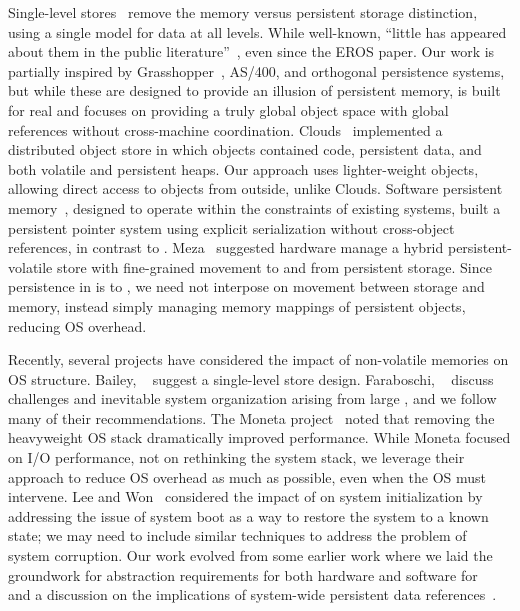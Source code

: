 {    Single-level stores~\cite{shapiro:usenix02,shekita:uwtr956,dearle:cs94} remove the
    memory versus persistent storage distinction, using a single model for data
    at all levels. While well-known,
    ``little has appeared about them in the public
    literature''~\cite{shapiro:usenix02}, even since the EROS paper.
    Our work is partially inspired by Grasshopper~\cite{dearle:cs94}, AS/400, and orthogonal persistence systems,
    but while these are designed to provide an illusion of persistent
    memory, \Twizzler is built for real \NVM and focuses on providing a truly global object space with
    global references without cross-machine coordination.
    Clouds~\cite{dasgupta:computer91} implemented a distributed object store in
    which objects contained code, persistent data, and both volatile and
    persistent heaps. Our approach uses lighter-weight objects, allowing direct
    access to objects from outside, unlike Clouds. Software persistent
    memory~\cite{guerra:atc12}, designed to operate within the constraints
    of existing systems, built a persistent pointer system using explicit
    serialization without cross-object references, in contrast to \Twizzler.
    Meza~\cite{meza:weed13}
    suggested hardware manage a hybrid persistent-volatile store with
    fine-grained movement to and from persistent storage. Since
    persistence in \Twizzler is to \NVM, we need not interpose on
    movement between storage and memory,
    instead simply managing memory mappings of persistent objects,
    reducing OS overhead.

    Recently, several projects have considered the impact of non-volatile
    memories on OS structure. Bailey,
    \etal~\cite{bailey:hotos11} suggest a single-level store design.
    Faraboschi, \etal~\cite{faraboschi:hotos15} discuss challenges and inevitable system organization
    arising from large \NVM, and we follow many of their recommendations.
    The Moneta
    project~\cite{caulfield:micro10} noted that removing the
    heavyweight OS stack dramatically improved performance.
    While Moneta focused on I/O performance, not on rethinking the
    system stack, we leverage their approach to reduce OS
    overhead as much as possible, even when the OS must intervene.
    Lee and Won~\cite{lee:hpcc13} considered the impact of \NVM on
    system initialization by addressing the issue of system boot as a way to restore
    the system to a known state; we may need to include similar techniques to
    address the problem of system corruption.
    Our work evolved from some earlier work where we laid the groundwork for abstraction requirements
    for both hardware and software for \NVM~\cite{bittman:hotstorage19} and a discussion on the
    implications of system-wide persistent data references~\cite{bittman:plos19}.

}
